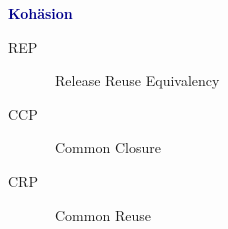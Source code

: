 \textbf{\textcolor{darkblue}{Kohäsion}}~
\begin{description}
	\item[\textsc{R}EP] \ \textcolor{mehrred}{R}elease Reuse Equivalency 
	\item[\textsc{C}CP] \ \textcolor{mehrred}{C}ommon Closure 
	\item[\textsc{C}RP] \ \textcolor{mehrred}{C}ommon Reuse 
\end{description}
